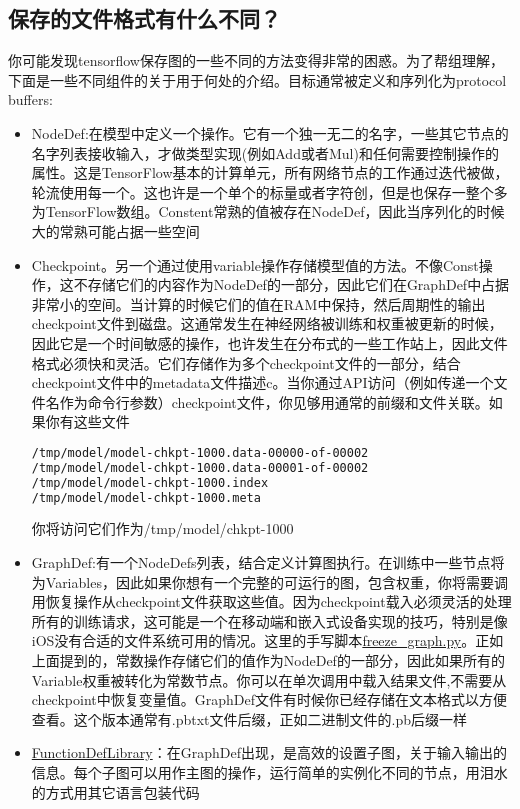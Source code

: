 \subsection{保存的文件格式有什么不同？}
你可能发现tensorflow保存图的一些不同的方法变得非常的困惑。为了帮组理解，下面是一些不同组件的关于用于何处的介绍。目标通常被定义和序列化为protocol buffers:
\begin{itemize}
\item NodeDef:在模型中定义一个操作。它有一个独一无二的名字，一些其它节点的名字列表接收输入，才做类型实现(例如Add或者Mul)和任何需要控制操作的属性。这是TensorFlow基本的计算单元，所有网络节点的工作通过迭代被做，轮流使用每一个。这也许是一个单个的标量或者字符创，但是也保存一整个多为TensorFlow数组。Constent常熟的值被存在NodeDef，因此当序列化的时候大的常熟可能占据一些空间
\item Checkpoint。另一个通过使用variable操作存储模型值的方法。不像Const操作，这不存储它们的内容作为NodeDef的一部分，因此它们在GraphDef中占据非常小的空间。当计算的时候它们的值在RAM中保持，然后周期性的输出checkpoint文件到磁盘。这通常发生在神经网络被训练和权重被更新的时候，因此它是一个时间敏感的操作，也许发生在分布式的一些工作站上，因此文件格式必须快和灵活。它们存储作为多个checkpoint文件的一部分，结合checkpoint文件中的metadata文件描述c。当你通过API访问（例如传递一个文件名作为命令行参数）checkpoint文件，你见够用通常的前缀和文件关联。如果你有这些文件
\begin{lstlisting}[language=Bash]
/tmp/model/model-chkpt-1000.data-00000-of-00002
/tmp/model/model-chkpt-1000.data-00001-of-00002
/tmp/model/model-chkpt-1000.index
/tmp/model/model-chkpt-1000.meta
\end{lstlisting}
你将访问它们作为/tmp/model/chkpt-1000
\item GraphDef:有一个NodeDefs列表，结合定义计算图执行。在训练中一些节点将为Variables，因此如果你想有一个完整的可运行的图，包含权重，你将需要调用恢复操作从checkpoint文件获取这些值。因为checkpoint载入必须灵活的处理所有的训练请求，这可能是一个在移动端和嵌入式设备实现的技巧，特别是像iOS没有合适的文件系统可用的情况。这里的手写脚本\href{https://www.github.com/tensorflow/tensorflow/blob/r1.4/tensorflow/python/tools/freeze_graph.py}{freeze\_graph.py}。正如上面提到的，常数操作存储它们的值作为NodeDef的一部分，因此如果所有的Variable权重被转化为常数节点。你可以在单次调用中载入结果文件,不需要从checkpoint中恢复变量值。GraphDef文件有时候你已经存储在文本格式以方便查看。这个版本通常有.pbtxt文件后缀，正如二进制文件的.pb后缀一样
\item \href{https://www.github.com/tensorflow/tensorflow/blob/r1.4/tensorflow/core/framework/function.proto}{FunctionDefLibrary}：在GraphDef出现，是高效的设置子图，关于输入输出的信息。每个子图可以用作主图的操作，运行简单的实例化不同的节点，用泪水的方式用其它语言包装代码

\end{itemize}
